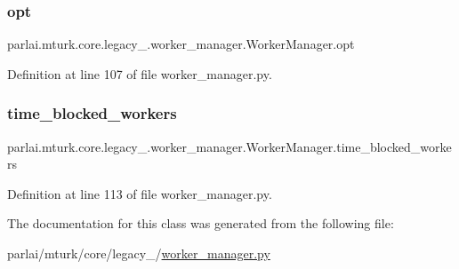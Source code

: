 \subsubsection{\texorpdfstring{opt}{opt}}
{\footnotesize\ttfamily parlai.\+mturk.\+core.\+legacy\+\_.\+worker\+\_\+manager.\+Worker\+Manager.\+opt}



Definition at line 107 of file worker\+\_\+manager.\+py.

\mbox{\label{classparlai_1_1mturk_1_1core_1_1legacy__2018_1_1worker__manager_1_1WorkerManager_a0bb97581f917b4dddca801e68fa5dfb3}} 
\subsubsection{\texorpdfstring{time\+\_\+blocked\+\_\+workers}{time\_blocked\_workers}}
{\footnotesize\ttfamily parlai.\+mturk.\+core.\+legacy\+\_.\+worker\+\_\+manager.\+Worker\+Manager.\+time\+\_\+blocked\+\_\+workers}



Definition at line 113 of file worker\+\_\+manager.\+py.



The documentation for this class was generated from the following file\+:\begin{DoxyCompactItemize}
\item 
parlai/mturk/core/legacy\+\_/\hyperlink{legacy__2018_2worker__manager_8py}{worker\+\_\+manager.\+py}\end{DoxyCompactItemize}
